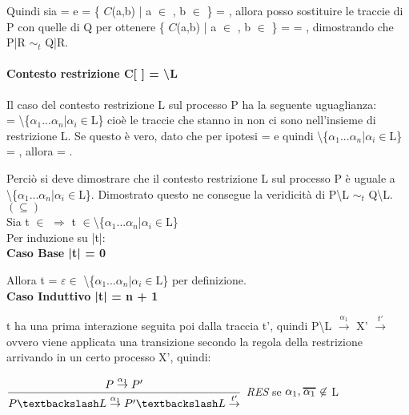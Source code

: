 Quindi sia  =  e  = \{ $C$(a,b) | a $\in$ , b $\in$ \} = , allora posso sostituire le traccie di P con quelle di Q per ottenere \{ $C$(a,b) | a $\in$ , b $\in$ \} =  = , dimostrando che P|R $\sim_{t}$ Q|R.

\paragraph{Contesto restrizione  C[ ] = \textbackslash L} \mbox{}

Il caso del contesto restrizione L sul processo P ha la seguente uguaglianza:\\  = \textbackslash\{$\alpha_{1}$...$\alpha_{n}$|$\alpha_{i}\in$L\} cioè le traccie che stanno in  non ci sono nell'insieme di restrizione L. Se questo è vero, dato che per ipotesi  =  e quindi \textbackslash \{$\alpha_{1}$...$\alpha_{n}$|$\alpha_{i}\in$L\} = , allora  = . 

Perciò si deve dimostrare che il contesto restrizione L sul processo P è uguale a \\
\textbackslash \{$\alpha_{1}$...$\alpha_{n}$|$\alpha_{i}\in$L\}. Dimostrato questo ne consegue la veridicità di P\textbackslash L $\sim_{t}$ Q\textbackslash L.\\

$(\subseteq)$ \\

Sia t $\in$  $\Rightarrow$  t $\in$\textbackslash\{$\alpha_{1}$...$\alpha_{n}$|$\alpha_{i}\in$L\}\\
Per induzione su |t|:
\\

\textbf{Caso Base |t| = 0}

Allora t = $\varepsilon \in$ \textbackslash\{$\alpha_{1}$...$\alpha_{n}$|$\alpha_{i}\in$L\} per definizione.
\\

\textbf{Caso Induttivo |t| = n + 1}

t ha una prima interazione seguita poi dalla traccia t', quindi P\textbackslash L $ \overset{\alpha_{1}}\rightarrow $ X' $\overset{t'}\rightarrow$ ovvero viene applicata una transizione secondo la regola della restrizione arrivando in un certo processo X', quindi:
	
	$\dfrac{P \overset{\alpha_{1}}\rightarrow P'}{P\textbackslash L \overset{\alpha_{1}}\rightarrow P'\textbackslash L\overset{t'}\rightarrow}$ \textit{RES} se $\alpha_{1}, \Overline[1pt]{\alpha_{1}} \not\in$ L\\
	
